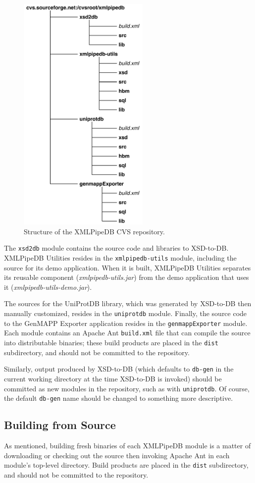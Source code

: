 \documentclass[11pt]{article}
\begin{document}
\begin{figure}[htbp] %
   \centering
   \includegraphics[width=2.5in]{figures/cvs.pdf} 
   \caption{Structure of the XMLPipeDB CVS repository.}
   \label{cvs}
\end{figure}

The \texttt{xsd2db} module contains the source code and libraries to XSD-to-DB.  XMLPipeDB Utilities resides in the \texttt{xmlpipedb-utils} module, including the source for its demo application.  When it is built, XMLPipeDB Utilities separates its reusable component (\emph{xmlpipedb-utils.jar}) from the demo application that uses it (\emph{xmlpipedb-utils-demo.jar}).

The sources for the UniProtDB library, which was generated by XSD-to-DB then manually customized, resides in the \texttt{uniprotdb} module.  Finally, the source code to the GenMAPP Exporter application resides in the \texttt{genmappExporter} module.  Each module contains an Apache Ant \texttt{build.xml} file that can compile the source into distributable binaries; these build products are placed in the \texttt{dist} subdirectory, and should not be committed to the repository.

Similarly, output produced by XSD-to-DB (which defaults to \texttt{db-gen} in the current working directory at the time XSD-to-DB is invoked) should be committed as new modules in the repository, such as with \texttt{uniprotdb}.  Of course, the default \texttt{db-gen} name should be changed to something more descriptive.

\subsection{Building from Source}

As mentioned, building fresh binaries of each XMLPipeDB module is a matter of downloading or checking out the source then invoking Apache Ant in each module's top-level directory.  Build products are placed in the \texttt{dist} subdirectory, and should not be committed to the repository.
\end{document}
